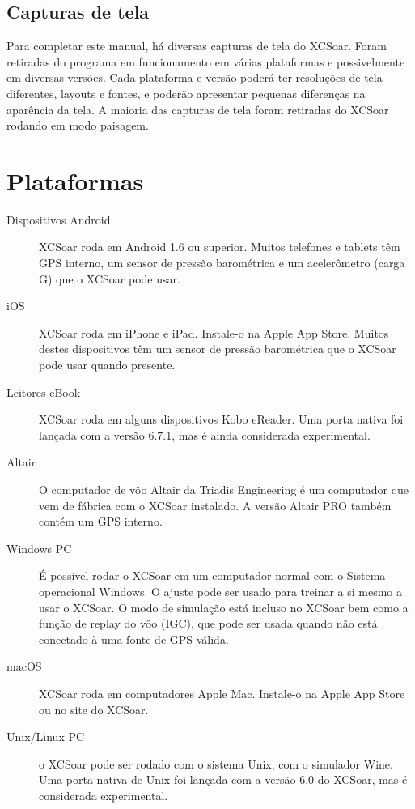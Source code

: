 \subsection*{Capturas de tela}
Para completar este manual, há diversas capturas de tela do XCSoar.  Foram retiradas do programa em funcionamento em várias plataformas e possivelmente em diversas versões.  Cada plataforma e versão poderá ter resoluções de tela diferentes, layouts e fontes, e poderão apresentar pequenas diferenças na aparência da tela.  A maioria das capturas de tela foram retiradas do XCSoar rodando em modo paisagem.

\section{Plataformas}
\begin{description}
\item[Dispositivos Android]
XCSoar roda em Android 1.6 ou superior.  Muitos telefones e tablets têm GPS interno, um sensor de pressão barométrica e um acelerômetro (carga G) que o XCSoar pode usar.
\item[iOS]
XCSoar roda em iPhone e iPad. Instale-o na Apple App Store.
Muitos destes dispositivos têm um sensor de pressão barométrica que o XCSoar pode usar quando presente.
\item [Leitores eBook]
XCSoar roda em alguns dispositivos Kobo eReader.  Uma porta nativa foi lançada com a versão 6.7.1, mas é ainda considerada experimental.
\item[Altair]
O computador de vôo Altair da Triadis Engineering é um computador que vem de fábrica com o XCSoar instalado.  A versão Altair PRO também contém um GPS interno.
\item[Windows PC]
É possível rodar o XCSoar em um computador normal com o Sistema operacional Windows.  O ajuste pode ser usado para treinar a si mesmo a usar o XCSoar.  O modo de simulação está incluso no XCSoar bem como a função de replay do vôo (IGC), que pode ser usada quando não está conectado à uma fonte de GPS válida.
\item[macOS]
XCSoar roda em computadores Apple Mac. Instale-o na Apple App Store
ou no site do XCSoar.
\item[Unix/Linux PC]
o XCSoar pode ser rodado com o sistema Unix, com o simulador Wine.  Uma porta nativa de Unix foi lançada com a versão 6.0 do XCSoar, mas é considerada experimental.
\end{description}



